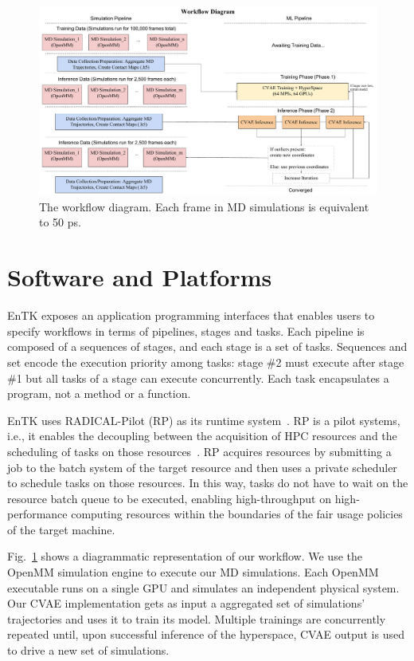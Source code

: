\documentclass[conference,final]{IEEEtran}
\begin{document}
\begin{figure}
	\centering
	\includegraphics[width=.8\textwidth]{MicroScope_Workflow_Diagram}
	\caption{The workflow diagram. Each frame in MD simulations is equivalent to 50 ps. }
	\label{fig:microscopeworkflowdiagram}
\end{figure}

\section{Software and Platforms}

EnTK exposes an application programming interfaces that enables users to
specify workflows in terms of pipelines, stages and tasks. Each pipeline is
composed of a sequences of stages, and each stage is a set of tasks.
Sequences and set encode the execution priority among tasks: stage \#2 must
execute after stage \#1 but all tasks of a stage can execute concurrently.
Each task encapsulates a program, not a method or a function.

EnTK uses RADICAL-Pilot (RP) as its runtime system~\cite{merzky2018using}. RP
is a pilot systems, i.e., it enables the decoupling between the acquisition
of HPC resources and the scheduling of tasks on those
resources~\cite{turilli2018comprehensive}. RP acquires resources by
submitting a job to the batch system of the target resource and then uses a
private scheduler to schedule tasks on those resources. In this way, tasks do
not have to wait on the resource batch queue to be executed, enabling
high-throughput on high-performance computing resources within the boundaries
of the fair usage policies of the target machine.

Fig.~\ref{fig:microscopeworkflowdiagram} shows a diagrammatic representation
of our workflow. We use the OpenMM simulation engine to execute our MD
simulations. Each OpenMM executable runs on a single GPU and simulates an
independent physical system. Our CVAE implementation gets as input a
aggregated set of simulations' trajectories and uses it to train its model.
Multiple trainings are concurrently repeated until, upon successful inference
of the hyperspace, CVAE output is used to drive a new set of simulations.
\end{document}
